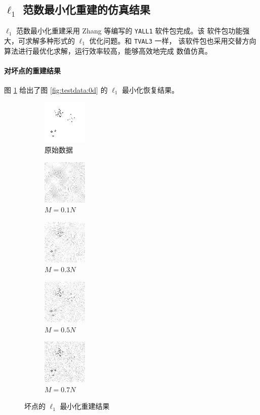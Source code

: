 \subsection{$\ell_1$ 范数最小化重建的仿真结果}

$\ell_1$ 范数最小化重建采用 Zhang 等编写的 \verb|YALL1| 软件包完成。该
软件包功能强大，可求解多种形式的 $\ell_1$ 优化问题。和 \verb|TVAL3| 一样，
该软件包也采用交替方向算法进行最优化求解，运行效率较高，能够高效地完成
数值仿真。

\paragraph{对坏点的重建结果} 图 \ref{fig:l10d} 给出了图 
\ref{fig:testdata:0d} 的 $\ell_1$ 最小化恢复结果。

\begin{figure}
\centering
\begin{subfigure}[t]{1.1in}
	\includegraphics{Figure/testdata/0d.png}
	\caption{原始数据}
\end{subfigure}
\begin{subfigure}[t]{1.1in}
	\includegraphics{Figure/L1/0d10.png}
	\caption{$M = 0.1 N$}
\end{subfigure}
\begin{subfigure}[t]{1.1in}
	\includegraphics{Figure/L1/0d30.png}
	\caption{$M = 0.3 N$}
\end{subfigure}
\begin{subfigure}[t]{1.1in}
	\includegraphics{Figure/L1/0d50.png}
	\caption{$M = 0.5 N$}
\end{subfigure}
\begin{subfigure}[t]{1.1in}
	\includegraphics{Figure/L1/0d70.png}
	\caption{$M = 0.7 N$}
\end{subfigure}
\caption{坏点的 $\ell_1$ 最小化重建结果}
\label{fig:l10d}
\end{figure}

